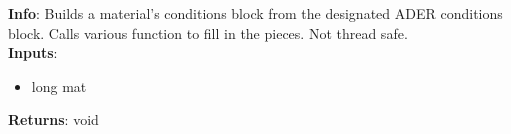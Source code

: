 \textbf{Info}: Builds a material's conditions block from the designated ADER
conditions block. Calls various function to fill in the pieces. Not thread
safe.\\

\noindent \textbf{Inputs}:
\begin{itemize}
\item{long mat}
\end{itemize}

\noindent \textbf{Returns}: void
